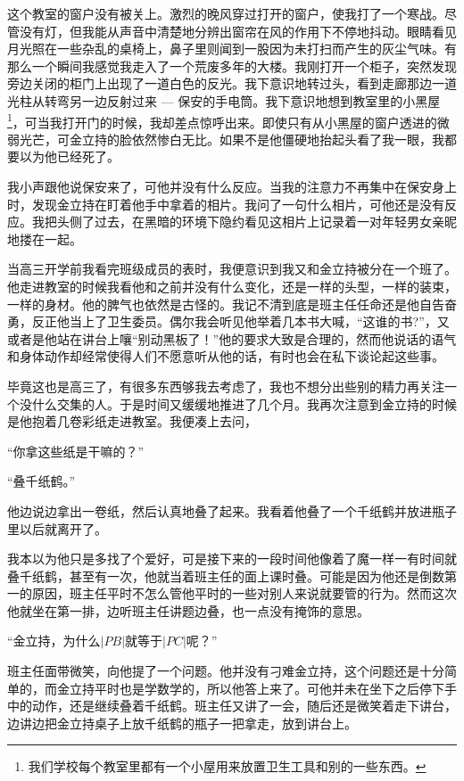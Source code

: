 \documentclass[UTF8,oneside]{ctexbook}
\begin{document}
这个教室的窗户没有被关上。激烈的晚风穿过打开的窗户，使我打了一个寒战。尽管没有灯，但我能从声音中清楚地分辨出窗帘在风的作用下不停地抖动。眼睛看见月光照在一些杂乱的桌椅上，鼻子里则闻到一股因为未打扫而产生的灰尘气味。有那么一个瞬间我感觉我走入了一个荒废多年的大楼。我刚打开一个柜子，突然发现旁边关闭的柜门上出现了一道白色的反光。我下意识地转过头，看到走廊那边一道光柱从转弯另一边反射过来 --- 保安的手电筒。我下意识地想到教室里的小黑屋\footnote{我们学校每个教室里都有一个小屋用来放置卫生工具和别的一些东西。}，可当我打开门的时候，我却差点惊呼出来。即使只有从小黑屋的窗户透进的微弱光芒，可金立持的脸依然惨白无比。如果不是他僵硬地抬起头看了我一眼，我都要以为他已经死了。

我小声跟他说保安来了，可他并没有什么反应。当我的注意力不再集中在保安身上时，发现金立持在盯着他手中拿着的相片。我问了一句什么相片，可他还是没有反应。我把头侧了过去，在黑暗的环境下隐约看见这相片上记录着一对年轻男女亲昵地搂在一起。

当高三开学前我看完班级成员的表时，我便意识到我又和金立持被分在一个班了。他走进教室的时候我看他和之前并没有什么变化，还是一样的头型，一样的装束，一样的身材。他的脾气也依然是古怪的。我记不清到底是班主任任命还是他自告奋勇，反正他当上了卫生委员。偶尔我会听见他举着几本书大喊，``这谁的书?''，又或者是他站在讲台上嚷``别动黑板了！''他的要求大致是合理的，然而他说话的语气和身体动作却经常使得人们不愿意听从他的话，有时也会在私下谈论起这些事。

毕竟这也是高三了，有很多东西够我去考虑了，我也不想分出些别的精力再关注一个没什么交集的人。于是时间又缓缓地推进了几个月。我再次注意到金立持的时候是他抱着几卷彩纸走进教室。我便凑上去问，

``你拿这些纸是干嘛的？''

``叠千纸鹤。''

他边说边拿出一卷纸，然后认真地叠了起来。我看着他叠了一个千纸鹤并放进瓶子里以后就离开了。

我本以为他只是多找了个爱好，可是接下来的一段时间他像着了魔一样一有时间就叠千纸鹤，甚至有一次，他就当着班主任的面上课时叠。可能是因为他还是倒数第一的原因，班主任平时不怎么管他平时的一些对别人来说就要管的行为。然而这次他就坐在第一排，边听班主任讲题边叠，也一点没有掩饰的意思。

``金立持，为什么$|PB|$就等于$|PC|$呢？''

班主任面带微笑，向他提了一个问题。他并没有刁难金立持，这个问题还是十分简单的，而金立持平时也是学数学的，所以他答上来了。可他并未在坐下之后停下手中的动作，还是继续叠着千纸鹤。班主任又讲了一会，随后还是微笑着走下讲台，边讲边把金立持桌子上放千纸鹤的瓶子一把拿走，放到讲台上。
\end{document}
